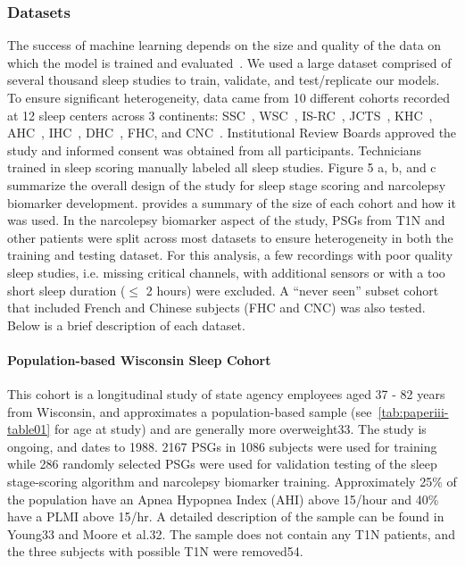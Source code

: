 \subsubsection{Datasets}
The success of machine learning depends on the size and quality of the data on which the model is trained and evaluated~\cite{Banko2001, Shotton2011}.
We used a large dataset comprised of several thousand sleep studies to train, validate, and test/replicate our models.
To ensure significant heterogeneity, data came from 10 different cohorts recorded at 12 sleep centers across 3 continents: SSC~\cite{Andlauer2013, Moore2014}, WSC~\cite{Moore2014, Young2009a}, IS-RC~\cite{Kuna2013}, JCTS~\cite{InternationalXyremStudyGroup2005}, KHC~\cite{Hong2006}, AHC~\cite{Frauscher2013}, IHC~\cite{Pizza2015}, DHC~\cite{Christensen2017}, FHC, and CNC~\cite{Andlauer2012}.
Institutional Review Boards approved the study and informed consent was obtained from all participants.
Technicians trained in sleep scoring manually labeled all sleep studies.
Figure 5 a, b, and c summarize the overall design of the study for sleep stage scoring and narcolepsy biomarker development.
 provides a summary of the size of each cohort and how it was used.
In the narcolepsy biomarker aspect of the study, PSGs from T1N and other patients were split across most datasets to ensure heterogeneity in both the training and testing dataset.
For this analysis, a few recordings with poor quality sleep studies, i.e. missing critical channels, with additional sensors or with a too short sleep duration ($\leq$ 2 hours) were excluded.
A “never seen” subset cohort that included French and Chinese subjects (FHC and CNC) was also tested.
Below is a brief description of each dataset.

\paragraph{Population-based Wisconsin Sleep Cohort}
This cohort is a longitudinal study of state agency employees aged 37 - 82 years from Wisconsin, and approximates a population-based sample (see~\cref{tab:paperiii-table01} for age at study) and are generally more overweight33.
The study is ongoing, and dates to 1988.
2167 PSGs in 1086 subjects were used for training while 286 randomly selected PSGs were used for validation testing of the sleep stage-scoring algorithm and narcolepsy biomarker training.
Approximately 25\% of the population have an Apnea Hypopnea Index (AHI) above 15/hour and 40\% have a PLMI above 15/hr.
A detailed description of the sample can be found in Young33 and Moore et al.32.
The sample does not contain any T1N patients, and the three subjects with possible T1N were removed54.


